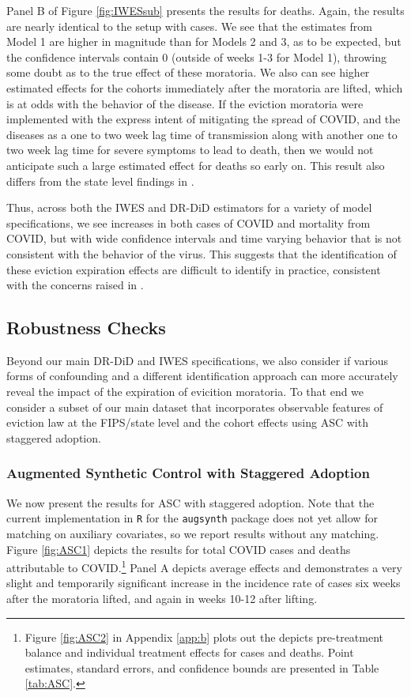 \documentclass[12pt]{amsart}
\begin{document}
Panel B of Figure \ref{fig:IWESsub} presents the results for deaths. Again, the results are nearly identical to the setup with cases. We see that the estimates from Model 1 are higher in magnitude than for Models 2 and 3, as to be expected, but the confidence intervals contain 0 (outside of weeks 1-3 for Model 1), throwing some doubt as to the true effect of these moratoria. We also can see higher estimated effects for the cohorts immediately after the moratoria are lifted, which is at odds with the behavior of the disease. If the eviction moratoria were implemented with the express intent of mitigating the spread of COVID, and the diseases as a one to two week lag time of transmission along with another one to two week lag time for severe symptoms to lead to death, then we would not anticipate such a large estimated effect for deaths so early on. This result also differs from the state level findings in . 

Thus, across both the IWES and DR-DiD estimators for a variety of model specifications, we see increases in both cases of COVID and mortality from COVID, but with wide confidence intervals and time varying behavior that is not consistent with the behavior of the virus. This suggests that the identification of these eviction expiration effects are difficult to identify in practice, consistent with the concerns raised in .

\subsection{Robustness Checks}

Beyond our main DR-DiD and IWES specifications, we also consider if various forms of confounding and a different identification approach can more accurately reveal the impact of the expiration of evicition moratoria. To that end we consider a subset of our main dataset that incorporates observable features of eviction law at the FIPS/state level and the cohort effects using ASC with staggered adoption. 

\subsubsection{Augmented Synthetic Control with Staggered Adoption}

We now present the results for ASC with staggered adoption. Note that the current implementation in {\tt R} for the {\tt augsynth} package does not yet allow for matching on auxiliary covariates, so we report results without any matching. Figure \ref{fig:ASC1} depicts the results for total COVID cases and deaths attributable to COVID.\footnote{Figure \ref{fig:ASC2} in Appendix \ref{app:b} plots out the depicts pre-treatment balance and individual treatment effects for cases and deaths. Point estimates, standard errors, and confidence bounds are presented in Table \ref{tab:ASC}. } Panel A depicts average effects and demonstrates a very slight and temporarily significant increase in the incidence rate of cases six weeks after the moratoria lifted, and again in weeks 10-12 after lifting. 
\end{document}
